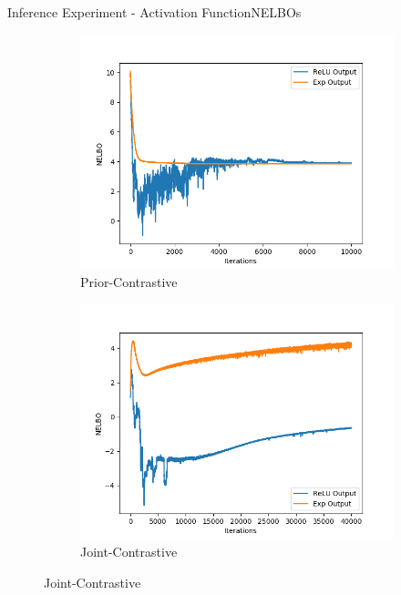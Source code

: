 \documentclass{beamer}
\begin{document}
\begin{frame}{Inference Experiment - Activation Function}{NELBOs}
\begin{figure}
\begin{subfigure}{0.49\textwidth}
\includegraphics[width=\linewidth]{nelbos/PCKLvsPCKLEXP.png}
\caption{Prior-Contrastive}
\end{subfigure}
\begin{subfigure}{0.49\textwidth}
\includegraphics[width=\linewidth]{nelbos/JCKLvsJCKLEXP.png}
\caption{Joint-Contrastive}
\end{subfigure}
\end{figure}
\end{frame}
\end{document}
